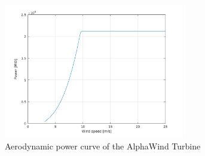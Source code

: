 \begin{figure}[H]
\centering
\includegraphics[width=0.7\textwidth]{Images/power_curve_aero.png} 
\caption{Aerodynamic power curve of the AlphaWind Turbine}
\label{fig:power_curve_aero}
\end{figure}

